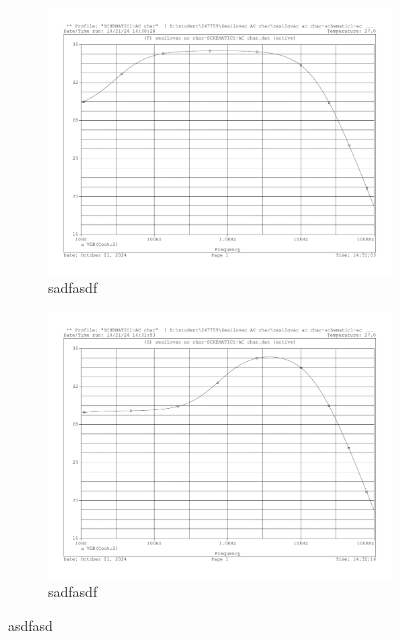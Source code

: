 \documentclass[a4paper, czech]{article}
\begin{document}
\begin{figure}[H]
    \centering
    \begin{subfigure}{0.49\textwidth}
        \centering
        \includegraphics[width=\textwidth]{charakteristiky/uloha3_Ck_5krat_vetsi_5u.pdf}
        \caption{sadfasdf}
    \end{subfigure}
    \hfill
    \begin{subfigure}{0.49\textwidth}
        \centering
        \includegraphics[width=\textwidth]{charakteristiky/uloha3_Ck_5krat_mensi_0_2u.pdf}
        \caption{sadfasdf}
    \end{subfigure}
    \caption{asdfasd}
\end{figure}
\end{document}
